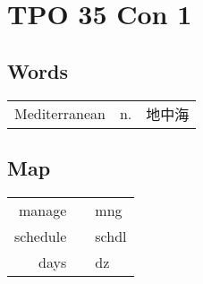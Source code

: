 \section{TPO 35 Con 1}

\subsection{Words}

\begin{tabular}{lll}
    Mediterranean & n. & 地中海 \\
\end{tabular}

\subsection{Map}

\begin{tabular}{rc@{\quad$\to$\quad}l}
    manage   &  & mng   \\
    schedule &  & schdl \\
    days     &  & dz    \\
\end{tabular}
